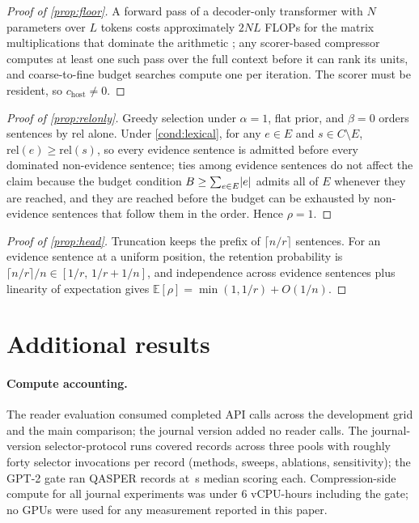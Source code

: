 \documentclass[review,12pt]{elsarticle}
\DeclarePairedDelimiter\abs{\lvert}{\rvert}
\theoremstyle{remark}
\begin{document}
\begin{proof}[Proof of \autoref{prop:floor}]
A forward pass of a decoder-only transformer with $N$ parameters over
$L$ tokens costs approximately $2NL$ FLOPs for the matrix
multiplications that dominate the arithmetic
\citep{kaplan2020scaling}; any scorer-based compressor computes at
least one such pass over the full context before it can rank its
units, and coarse-to-fine budget searches compute one per iteration.
The scorer must be resident, so $c_{\mathrm{host}} \ne 0$.
\end{proof}

\begin{proof}[Proof of \autoref{prop:relonly}]
Greedy selection under $\alpha = 1$, flat prior, and $\beta = 0$
orders sentences by $\mathrm{rel}$ alone. Under
\autoref{cond:lexical}, for any $e \in E$ and
$s \in C \setminus E$, $\mathrm{rel}(e) \ge \mathrm{rel}(s)$, so every
evidence sentence is admitted before every dominated non-evidence
sentence; ties among evidence sentences do not affect the claim
because the budget condition
$B \ge \sum_{e \in E} \abs{e}$ admits all of $E$ whenever they are
reached, and they are reached before the budget can be exhausted by
non-evidence sentences that follow them in the order. Hence $\rho=1$.
\end{proof}

\begin{proof}[Proof of \autoref{prop:head}]
Truncation keeps the prefix of $\lceil n/r \rceil$ sentences. For an
evidence sentence at a uniform position, the retention probability is
$\lceil n/r \rceil / n \in [1/r,\, 1/r + 1/n]$, and independence
across evidence sentences plus linearity of expectation gives
$\mathbb{E}[\rho] = \min(1, 1/r) + O(1/n)$.
\end{proof}

\section{Additional results}
\label{app:results}

\paragraph{Compute accounting.}
The reader evaluation consumed \TotalCalls{} completed API calls
across the development grid and the main comparison; the journal
version added no reader calls. The journal-version selector-protocol
runs covered \TotalRecords{} records across three pools with roughly
forty selector invocations per record (methods, sweeps, ablations,
sensitivity); the GPT-2 gate ran \GateN{} QASPER records at
\GateLatMedS\,s median scoring each. Compression-side compute for all
journal experiments was under 6 vCPU-hours including the gate; no
GPUs were used for any measurement reported in this paper.
\end{document}
